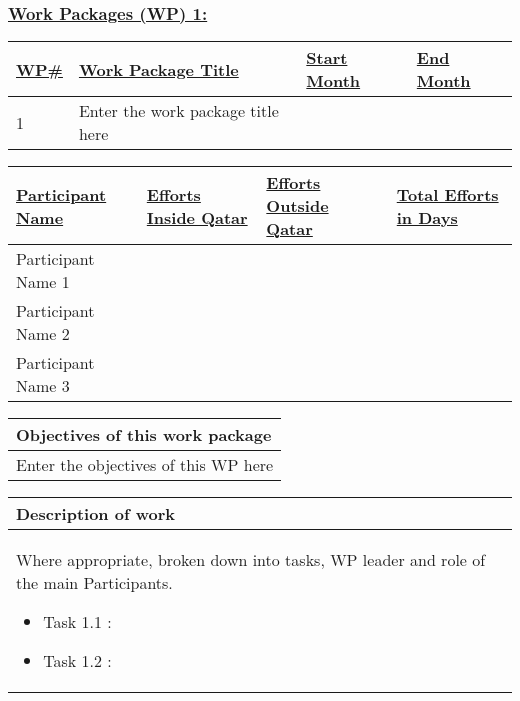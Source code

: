 \documentclass[a4paper,11pt]{nprp}
\newlength{\realwidth}
\begin{document}
\subsubsection{\underline{Work Packages (WP) 1:}}

\begin{center}

\setlength{\realwidth}{\dimexpr \textwidth - 8\tabcolsep - 5\arrayrulewidth}
\begin{tabular}{|p{0.1\realwidth}|p{0.6\realwidth}|p{0.15\realwidth}|p{0.15\realwidth}|}
\hline
  \textbf{\ul{WP\#}} & 
  \textbf{\ul{Work Package Title}} & 
  \textbf{\ul{Start Month}} &
  \textbf{\ul{End Month}} \\
\hline
1 & Enter the work package title here &  &  \\
\hline
\end{tabular}

\vspace{1em}

\setlength{\realwidth}{\dimexpr \textwidth - 8\tabcolsep - 5\arrayrulewidth}
\begin{tabular}{|p{0.4\realwidth}|p{0.22\realwidth}|p{0.2\realwidth}|C{0.18\realwidth}|}
\hline
  \textbf{\ul{Participant Name}} & 
  \textbf{\ul{Efforts Inside Qatar}} & 
  \textbf{\ul{Efforts Outside Qatar}} &
  \textbf{\ul{Total Efforts in Days}} \\
\hline
Participant Name 1 &  &  &  \\
\hline
Participant Name 2 &  &  &  \\
\hline
Participant Name 3 &  &  &  \\
\hline
\end{tabular}

\vspace{1em}

\setlength{\realwidth}{\dimexpr \textwidth - 2\tabcolsep - 2\arrayrulewidth}
\begin{tabular}{|p{1\realwidth}|}
\hline
\textbf{Objectives of this work package} \\
\hline
Enter the objectives of this WP here \\
\hline
\end{tabular}

\vspace{1em}

\begin{tabular}{|p{1\realwidth}|}
\hline
\textbf{Description of work} \\
\hline
Where appropriate, broken down into tasks, WP leader and role of the main Participants.
\begin{itemize}
  \item Task 1.1 :
  \item Task 1.2 :
\end{itemize}
 \\
\hline
\end{tabular}


\end{center}
\end{document}
